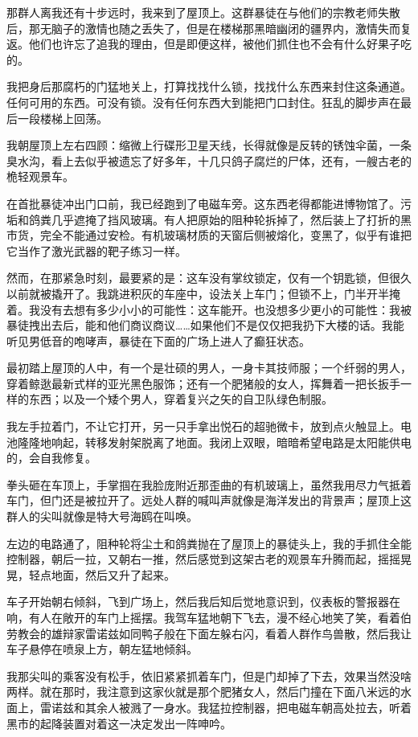 \documentclass[AutoFakeBold=true]{book}
\begin{document}
那群人离我还有十步远时，我来到了屋顶上。这群暴徒在与他们的宗教老师失散后，那无脑子的激情也随之丢失了，但是在楼梯那黑暗幽闭的疆界内，激情失而复返。他们也许忘了追我的理由，但是即便这样，被他们抓住也不会有什么好果子吃的。

我把身后那腐朽的门猛地关上，打算找找什么锁，找找什么东西来封住这条通道。任何可用的东西。可没有锁。没有任何东西大到能把门口封住。狂乱的脚步声在最后一段楼梯上回荡。

我朝屋顶上左右四顾：缩微上行碟形卫星天线，长得就像是反转的锈蚀伞菌，一条臭水沟，看上去似乎被遗忘了好多年，十几只鸽子腐烂的尸体，还有，一艘古老的桅轻观景车。

在首批暴徒冲出门口前，我已经跑到了电磁车旁。这东西老得都能进博物馆了。污垢和鸽粪几乎遮掩了挡风玻璃。有人把原始的阻种轮拆掉了，然后装上了打折的黑市货，完全不能通过安检。有机玻璃材质的天窗后侧被熔化，变黑了，似乎有谁把它当作了激光武器的靶子练习一样。

然而，在那紧急时刻，最要紧的是：这车没有掌纹锁定，仅有一个钥匙锁，但很久以前就被撬开了。我跳进积灰的车座中，设法关上车门；但锁不上，门半开半掩着。我没有去想有多少小小的可能性：这车能开。也没想多少更小的可能性：我被暴徒拽出去后，能和他们商议商议……如果他们不是仅仅把我扔下大楼的话。我能听见男低音的咆哮声，暴徒在下面的广场上进人了癫狂状态。

最初踏上屋顶的人中，有一个是壮硕的男人，一身卡其技师服；一个纤弱的男人，穿着鲸逖最新式样的亚光黑色服饰；还有一个肥猪般的女人，挥舞着一把长扳手一样的东西；以及一个矮个男人，穿着复兴之矢的自卫队绿色制服。

我左手拉着门，不让它打开，另一只手拿出悦石的超驰微卡，放到点火触显上。电池隆隆地响起，转移发射架脱离了地面。我闭上双眼，暗暗希望电路是太阳能供电的，会自我修复。

拳头砸在车顶上，手掌掴在我脸庞附近那歪曲的有机玻璃上，虽然我用尽力气抵着车门，但门还是被拉开了。远处人群的喊叫声就像是海洋发出的背景声；屋顶上这群人的尖叫就像是特大号海鸥在叫唤。

左边的电路通了，阻种轮将尘土和鸽粪抛在了屋顶上的暴徒头上，我的手抓住全能控制器，朝后一拉，又朝右一推，然后感觉到这架古老的观景车升腾而起，摇摇晃晃，轻点地面，然后又升了起来。

车子开始朝右倾斜，飞到广场上，然后我后知后觉地意识到，仪表板的警报器在响，有人在敞开的车门上摇摆。我驾车猛地朝下飞去，漫不经心地笑了笑，看着伯劳教会的雄辩家雷诺兹如同鸭子般在下面左躲右闪，看着人群作鸟兽散，然后我让车子悬停在喷泉上方，朝左猛地倾斜。

我那尖叫的乘客没有松手，依旧紧紧抓着车门，但是门却掉了下去，效果当然没啥两样。就在那时，我注意到这家伙就是那个肥猪女人，然后门撞在下面八米远的水面上，雷诺兹和其余人被溅了一身水。我猛拉控制器，把电磁车朝高处拉去，听着黑市的起降装置对着这一决定发出一阵呻吟。
\end{document}
